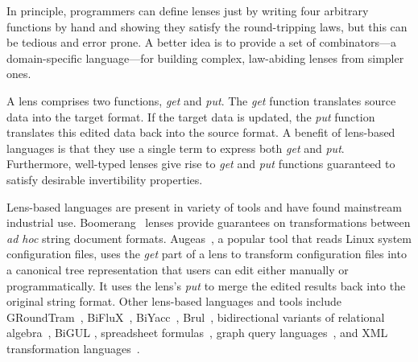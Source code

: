 \documentclass[12pt]{article}
\begin{document}
{%
%

In principle, programmers can define lenses just by writing four arbitrary
functions by hand and showing they satisfy the round-tripping laws, but this
can be tedious and error prone.  A better idea is to provide a set of
combinators---a domain-specific language---for building complex, law-abiding
lenses from simpler ones. 

A lens comprises two functions,
\emph{get} and \emph{put}.  The \emph{get} function translates
source data into the target format.  If the target data is updated, the
\emph{put} function translates this edited data back into the
source format.  
A benefit of lens-based languages is that they use a single term
to express both 
\emph{get} and \emph{put}.
Furthermore, well-typed lenses give rise to 
\emph{get} and \emph{put} functions 
guaranteed to satisfy desirable invertibility properties.

Lens-based languages are present in variety of tools and have found mainstream
industrial use.
Boomerang~\cite{boomerang, Matching10} lenses provide
guarantees on transformations between {\em ad hoc} string document formats.
Augeas~\cite{augeas}, a popular tool that reads Linux system configuration
files, uses the \emph{get} part of a lens to transform configuration
files into a canonical tree representation that users can edit
either manually or 
programmatically.  It uses the lens's \emph{put} to merge the edited
results back into the original string format.  Other lens-based languages and
tools include 
%
GRoundTram~\cite{Hidaka2011GRoundTramAI},
%
BiFluX~\cite{DBLP:conf/ppdp/PachecoZH14}, 
%
BiYacc~\cite{DBLP:conf/staf/ZhuK0SH15},
%
Brul~\cite{DBLP:conf/etaps/ZanLKH16},
%
bidirectional variants of 
relational algebra~\cite{BohannonPierceVaughan},
%
BiGUL \cite{DBLP:conf/pepm/KoZH16}, 
%
spreadsheet formulas~\cite{DBLP:conf/vl/MacedoPSC14},
graph query languages~\cite{DBLP:conf/icfp/HidakaHIKMN10},
and
XML transformation languages~\cite{DBLP:conf/pepm/LiuHT07}.


}
\end{document}
